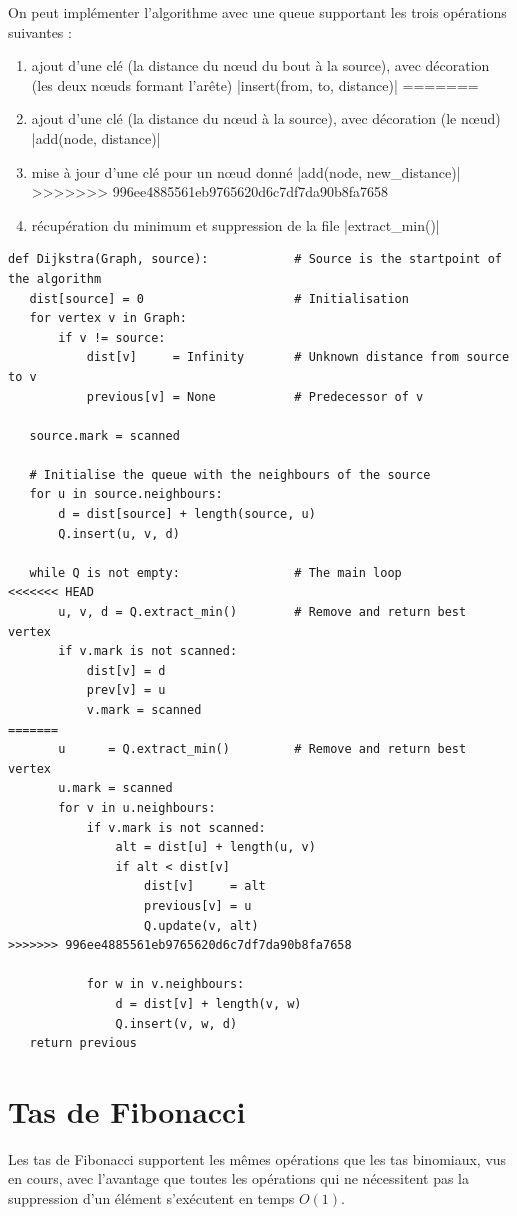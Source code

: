 \documentclass{article}
\begin{document}
On peut implémenter l'algorithme avec une queue supportant les trois
opérations suivantes :
\begin{enumerate}
<<<<<<< HEAD
  \item ajout d'une clé (la distance du nœud du bout à la source), avec
    décoration (les deux nœuds formant l'arête) 
    |insert(from, to, distance)|
=======
  \item ajout d'une clé (la distance du nœud à la source), avec
    décoration (le nœud)
    |add(node, distance)|
  \item mise à jour d'une clé pour un nœud donné
    |add(node, new_distance)|
>>>>>>> 996ee4885561eb9765620d6c7df7da90b8fa7658
  \item récupération du minimum et suppression de la file
    |extract_min()|
\end{enumerate}
\begin{verbatim}
def Dijkstra(Graph, source):            # Source is the startpoint of the algorithm
   dist[source] = 0                     # Initialisation
   for vertex v in Graph:
       if v != source:
           dist[v]     = Infinity       # Unknown distance from source to v
           previous[v] = None           # Predecessor of v

   source.mark = scanned

   # Initialise the queue with the neighbours of the source
   for u in source.neighbours:
       d = dist[source] + length(source, u)
       Q.insert(u, v, d)

   while Q is not empty:                # The main loop
<<<<<<< HEAD
       u, v, d = Q.extract_min()        # Remove and return best vertex
       if v.mark is not scanned:
           dist[v] = d
           prev[v] = u
           v.mark = scanned
=======
       u      = Q.extract_min()         # Remove and return best vertex
       u.mark = scanned
       for v in u.neighbours:
           if v.mark is not scanned:
               alt = dist[u] + length(u, v)
               if alt < dist[v]
                   dist[v]     = alt
                   previous[v] = u
                   Q.update(v, alt)
>>>>>>> 996ee4885561eb9765620d6c7df7da90b8fa7658

           for w in v.neighbours: 
               d = dist[v] + length(v, w) 
               Q.insert(v, w, d)
   return previous
\end{verbatim}
\section{Tas de Fibonacci}\label{sec:tas-de-fibonacci}
  Les tas de Fibonacci supportent les mêmes opérations que les tas binomiaux, vus en cours, avec l'avantage que toutes les opérations qui ne nécessitent pas la suppression d'un élément s'exécutent en temps $O(1)$.
\end{document}
